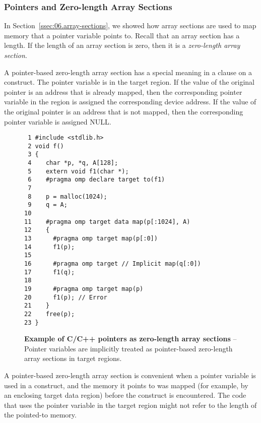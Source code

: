 \subsubsection{Pointers and Zero-length Array Sections}
\label{ssec:06.zero-array-sections}

In Section~\ref{ssec:06.array-sections}, we showed how array sections are used
to map memory that a pointer variable points to.  Recall that an
array section has a length.  If the length of an array section is zero, then it
is a \emph{zero-length array section}.

A pointer-based zero-length array section has a special meaning in a
 clause on a  construct.  The pointer variable is
 in the target region.  If the value of the original pointer is
an address that is already mapped, then the corresponding  pointer variable in the
 region is assigned the corresponding device address.  If the
value of the original pointer is an address that is not mapped, then the corresponding
 pointer variable is assigned NULL.

\begin{figure*}[!tb]
\begin{verbatim}
 1 #include <stdlib.h>
 2 void f()
 3 {
 4    char *p, *q, A[128];
 5    extern void f1(char *);
 6    #pragma omp declare target to(f1) 
 7 
 8    p = malloc(1024);
 9    q = A;
10 
11    #pragma omp target data map(p[:1024], A)
12    {
13      #pragma omp target map(p[:0])
14      f1(p);
15 
16      #pragma omp target // Implicit map(q[:0])
17      f1(q);
18 
19      #pragma omp target map(p)
20      f1(p); // Error 
21    }
22    free(p);
23 }
\end{verbatim}
\caption{ \textbf {Example of C/C++ pointers as zero-length array sections} -- \small
          Pointer variables are implicitly treated as pointer-based zero-length array
          sections in target regions.
         }
\label{figure:chapter6-zerolength}
\end{figure*}

A pointer-based zero-length array section is convenient when a pointer variable is
used in a  construct, and the memory it points to was mapped (for
example, by an enclosing target data region) before the  construct is
encountered.  The code that uses the pointer variable in the target region 
might not refer to the length of the pointed-to memory.


